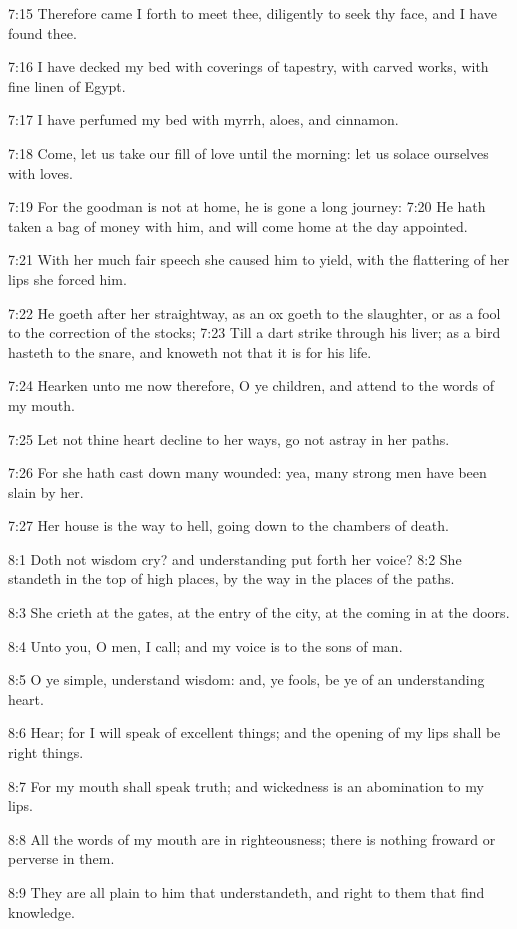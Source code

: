 7:15 Therefore came I forth to meet thee, diligently to seek thy face, and I have found thee.

7:16 I have decked my bed with coverings of tapestry, with carved works, with fine linen of Egypt.

7:17 I have perfumed my bed with myrrh, aloes, and cinnamon.

7:18 Come, let us take our fill of love until the morning: let us solace ourselves with loves.

7:19 For the goodman is not at home, he is gone a long journey: 7:20 He hath taken a bag of money with him, and will come home at the day appointed.

7:21 With her much fair speech she caused him to yield, with the flattering of her lips she forced him.

7:22 He goeth after her straightway, as an ox goeth to the slaughter, or as a fool to the correction of the stocks; 7:23 Till a dart strike through his liver; as a bird hasteth to the snare, and knoweth not that it is for his life.

7:24 Hearken unto me now therefore, O ye children, and attend to the words of my mouth.

7:25 Let not thine heart decline to her ways, go not astray in her paths.

7:26 For she hath cast down many wounded: yea, many strong men have been slain by her.

7:27 Her house is the way to hell, going down to the chambers of death.

8:1 Doth not wisdom cry? and understanding put forth her voice?  8:2 She standeth in the top of high places, by the way in the places of the paths.

8:3 She crieth at the gates, at the entry of the city, at the coming in at the doors.

8:4 Unto you, O men, I call; and my voice is to the sons of man.

8:5 O ye simple, understand wisdom: and, ye fools, be ye of an understanding heart.

8:6 Hear; for I will speak of excellent things; and the opening of my lips shall be right things.

8:7 For my mouth shall speak truth; and wickedness is an abomination to my lips.

8:8 All the words of my mouth are in righteousness; there is nothing froward or perverse in them.

8:9 They are all plain to him that understandeth, and right to them that find knowledge.


